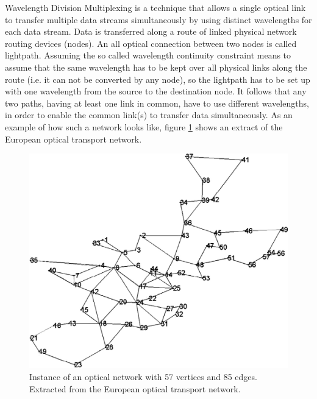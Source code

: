 Wavelength Division Multiplexing is a technique that allows a single optical link to transfer multiple data streams simultaneously by using distinct wavelengths for each data stream. Data is transferred along a route of linked physical network routing devices (nodes). An all optical connection between two nodes is called lightpath. Assuming the so called wavelength continuity constraint \cite{markovic-10} means to assume that the same wavelength has to be kept over all physical links along the route (i.e. it can not be converted by any node), so the lightpath has to be set up with one wavelength from the source to the destination node. It follows that any two paths, having at least one link in common, have to use different wavelengths, in order to enable the common link(s) to transfer data simultaneously. As an example of how such a network looks like, figure \ref{pd:opticalNetwork} shows an extract of the European optical transport network.\\

\begin{figure}
\begin{center}
\includegraphics[scale=0.2]{figures/rwa.png}
\caption{Instance of an optical network with 57 vertices and 85 edges. Extracted from the European optical transport network. \cite{belgacem-13}}
\label{pd:opticalNetwork}
\end{center}
\end{figure}
  
